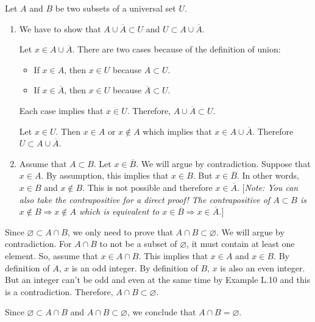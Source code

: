 \begin{problem}
Let $A$ and $B$ be two subsets of a universal set $U$.
    \begin{enumerate}[label=\alph*)]
        \item We have to show that $A \cup \overline{A} \subset U$ and $U \subset A \cup \overline{A}$. 

        Let $x \in A \cup \overline{A}$. There are two cases because of the definition of union:
            \begin{itemize}
                \item If $x \in A$, then $x \in U$ because $A \subset U$.
                \item If $x \in \overline{A}$, then $x \in U$ because $\overline{A} \subset U$.
            \end{itemize}
        Each case implies that $x \in U$. Therefore, $A \cup \overline{A} \subset U$.

        Let $x \in U$. Then $x \in A$ or $x \not\in A$ which implies that $x \in A \cup \overline{A}$. Therefore $U \subset A \cup \overline{A}$. 
        \item Assume that $A \subset B$. Let $x \in \overline{B}$. We will argue by contradiction. Suppose that $x \in A$. By assumption, this implies that $x \in B$. But $x \in \overline{B}$. In other words, $x \in B$ and $x \not\in B$. This is not possible and therefore $x \in \overline{A}$. [\textit{Note: You can also take the contrapositive for a direct proof! The contrapositive of $A \subset B$ is $x \not\in B \Rightarrow x \not\in A$ which is equivalent to $x \in \overline{B} \Rightarrow x \in \overline{A}$.}]
    \end{enumerate}
\end{problem}

\begin{problem}
Since $\varnothing \subset A \cap B$, we only need to prove that $A \cap B \subset \varnothing$. We will argue by contradiction. For $A \cap B$ to not be a subset of $\varnothing$, it must contain at least one element. So, assume that $x \in A \cap B$. This implies that $x \in A$ and $x \in B$. By definition of $A$, $x$ is an odd integer. By definition of $B$, $x$ is also an even integer. But an integer can't be odd and even at the same time by Example L.10 and this is a contradiction. Therefore, $A \cap B \subset \varnothing$.

Since $\varnothing \subset A \cap B$ and $A \cap B \subset \varnothing$, we conclude that $A \cap B = \varnothing$.
\end{problem}

